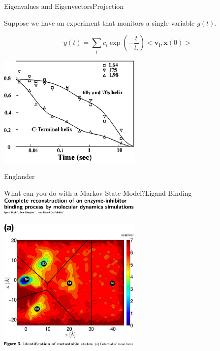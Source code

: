 \documentclass[10pt]{beamer}
\begin{document}
\begin{frame}{Eigenvalues and Eigenvectors}{Projection}
 
Suppose we have an experiment that monitors a single variable $y(t)$.  

$$y(t) = \sum_i c_i \exp (-\frac{t}{t_i})   <\mathbf{v_i}, \mathbf{x}(0)> $$
 
  \includegraphics[width=7.0cm]{Figures/CytC.png}
 
 \tiny Englander
 
\end{frame}

\begin{frame}{What can you do with a Markov State Model?}{Ligand Binding}
\includegraphics[width=7.0cm]{Figures/gianni.png}

\includegraphics[width=7.0cm]{Figures/gianni_fig.png}
 
 
\end{frame}
\end{document}

